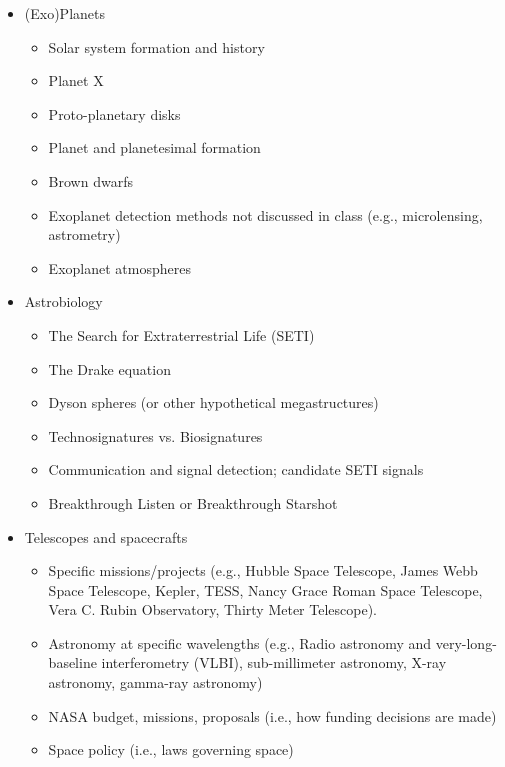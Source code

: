 \documentclass[11pt]{article}
\begin{document}
\begin{itemize}[noitemsep]
    \item (Exo)Planets
        \begin{itemize}[noitemsep]
            \item Solar system formation and history
            \item Planet X
            \item Proto-planetary disks
            \item Planet and planetesimal formation
            \item Brown dwarfs
            \item Exoplanet detection methods not discussed in class (e.g., microlensing, astrometry)
            \item Exoplanet atmospheres
        \end{itemize}
    
    \item Astrobiology
    \begin{itemize}[noitemsep]
        \item The Search for Extraterrestrial Life (SETI)
        \item The Drake equation
        \item Dyson spheres (or other hypothetical megastructures)
        \item Technosignatures vs. Biosignatures
        \item Communication and signal detection; candidate SETI signals
        \item Breakthrough Listen or Breakthrough Starshot
    \end{itemize}
    
    \item Telescopes and spacecrafts
        \begin{itemize}[noitemsep]
            \item Specific missions/projects (e.g., Hubble Space Telescope, James Webb Space Telescope, Kepler, TESS, Nancy Grace Roman Space Telescope, Vera C. Rubin Observatory, Thirty Meter Telescope).
            \item Astronomy at specific wavelengths (e.g., Radio astronomy and very-long-baseline interferometry (VLBI), sub-millimeter astronomy, X-ray astronomy, gamma-ray astronomy)
            \item NASA budget, missions, proposals (i.e., how funding decisions are made)
            \item Space policy (i.e., laws governing space)
        \end{itemize}


\end{itemize}
\end{document}

